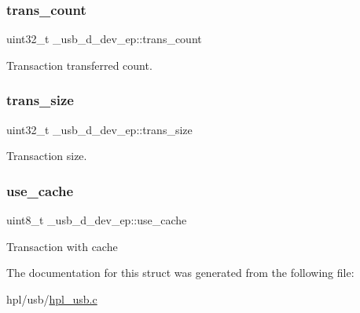 \subsubsection{\texorpdfstring{trans\+\_\+count}{trans\_count}}
{\footnotesize\ttfamily uint32\+\_\+t \+\_\+usb\+\_\+d\+\_\+dev\+\_\+ep\+::trans\+\_\+count}

Transaction transferred count. \mbox{\label{struct__usb__d__dev__ep_afb1bb784ecb141ded602492986c9b143}} 
\subsubsection{\texorpdfstring{trans\+\_\+size}{trans\_size}}
{\footnotesize\ttfamily uint32\+\_\+t \+\_\+usb\+\_\+d\+\_\+dev\+\_\+ep\+::trans\+\_\+size}

Transaction size. \mbox{\label{struct__usb__d__dev__ep_a28ed1e059170e6614ceaa07a1e0a408c}} 
\subsubsection{\texorpdfstring{use\+\_\+cache}{use\_cache}}
{\footnotesize\ttfamily uint8\+\_\+t \+\_\+usb\+\_\+d\+\_\+dev\+\_\+ep\+::use\+\_\+cache}

Transaction with cache 

The documentation for this struct was generated from the following file\+:\begin{DoxyCompactItemize}
\item 
hpl/usb/\hyperlink{hpl__usb_8c}{hpl\+\_\+usb.\+c}\end{DoxyCompactItemize}
